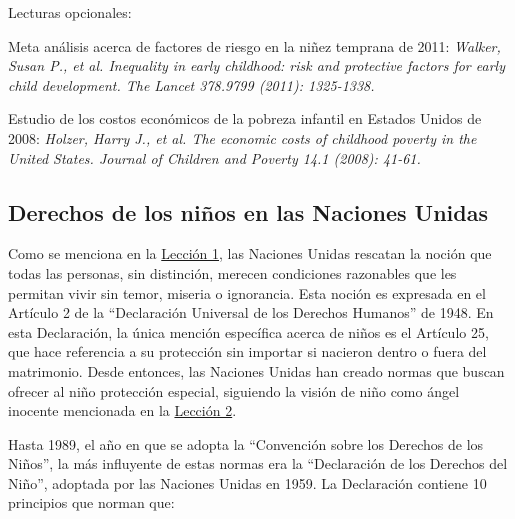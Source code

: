 \documentclass{tufte-handout}
\begin{document}
\bigskip

Lecturas opcionales:

\bigskip

Meta análisis acerca de factores de riesgo en la niñez temprana de 2011: \textit{Walker, Susan P., et al. Inequality in early childhood: risk and protective factors for early child development. The Lancet 378.9799 (2011): 1325-1338.}

\bigskip

Estudio de los costos económicos de la pobreza infantil en Estados Unidos de 2008: \textit{Holzer, Harry J., et al. The economic costs of childhood poverty in the United States. Journal of Children and Poverty 14.1 (2008): 41-61.}

\bigskip

\subsection{Derechos de los niños en las Naciones Unidas}\label{subsec:nacionesunidas}


Como se menciona en la \hyperref[subsec:derecho]{Lección 1}, las Naciones Unidas rescatan la noción que todas las personas, sin distinción, merecen condiciones razonables que les permitan vivir sin temor, miseria o ignorancia. Esta noción es expresada en el Artículo 2 de la “Declaración Universal de los Derechos Humanos” de 1948. En esta Declaración, la única mención específica acerca de niños es el Artículo 25, que hace referencia a su protección sin importar si nacieron dentro o fuera del matrimonio. Desde entonces, las Naciones Unidas han creado normas que buscan ofrecer al niño protección especial, siguiendo la visión de niño como ángel inocente mencionada en la \hyperref[subsec:visiones]{Lección 2}. 

Hasta 1989, el año en que se adopta la “Convención sobre los Derechos de los Niños”, la más influyente de estas normas era la “Declaración de los Derechos del Niño”, adoptada por las Naciones Unidas en 1959. La Declaración contiene 10 principios que norman que:
\end{document}
